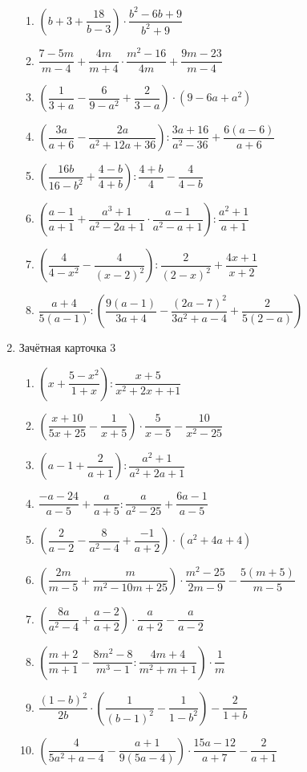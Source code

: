 \documentclass[12pt, a4paper]{article}
\begin{document}
\begin{enumerate}
\begin{enumerate}[label=\asbuk*)]
		\item \( \left( b+3+\dfrac{18}{b-3} \right)\cdot\dfrac{b^2-6b+9}{b^2+9} \)
		\item \( \dfrac{7-5m}{m-4}+\dfrac{4m}{m+4} \cdot\dfrac{m^2-16}{4m}+\dfrac{9m-23}{m-4}\)
		\item \( \left( \dfrac{1}{3+a}-\dfrac{6}{9-a^2}+\dfrac{2}{3-a} \right)\cdot(9-6a+a^2) \)
		\item \( \left(  \dfrac{3a}{a+6}-\dfrac{2a}{a^2+12a+36}\right) :\dfrac{3a+16}{a^2-36}+\dfrac{6(a-6)}{a+6}\)
		\item \( \left( \dfrac{16b}{16-b^2}+\dfrac{4-b}{4+b} \right):\dfrac{4+b}{4}-\dfrac{4}{4-b} \)
		\item \( \left( \dfrac{a-1}{a+1}+\dfrac{a^3+1}{a^2-2a+1}\cdot\dfrac{a-1}{a^2-a+1} \right):\dfrac{a^2+1}{a+1} \)
		\item \( \left( \dfrac{4}{4-x^2}-\dfrac{4}{(x-2)^2} \right) :\dfrac{2}{(2-x)^2}+\dfrac{4x+1}{x+2}\)
		\item \( \dfrac{a+4}{5(a-1)}:\left( \dfrac{9(a-1)}{3a+4}-\dfrac{(2a-7)^2}{3a^2+a-4}+\dfrac{2}{5(2-a)} \right) \)
	\end{enumerate}
	\item Зачётная карточка 3
	\begin{enumerate}[label=\asbuk*)]
		\item \( \left( x+\dfrac{5-x^2}{1+x} \right):\dfrac{x+5}{x^2+2x++1} \)
		\item \( \left( \dfrac{x+10}{5x+25} -\dfrac{1}{x+5}\right) \cdot\dfrac{5}{x-5}-\dfrac{10}{x^2-25}\)
		\item \( \left( a-1+\dfrac{2}{a+1} \right):\dfrac{a^2+1}{a^2+2a+1} \)
		\item \( \dfrac{-a-24}{a-5}+\dfrac{a}{a+5}:\dfrac{a}{a^2-25}+\dfrac{6a-1}{a-5} \)
		\item \( \left( \dfrac{2}{a-2}-\dfrac{8}{a^2-4}+\dfrac{-1}{a+2} \right)\cdot(a^2+4a+4) \)
		\item \( \left( \dfrac{2m}{m-5}+\dfrac{m}{m^2-10m+25} \right) \cdot\dfrac{m^2-25}{2m-9}-\dfrac{5(m+5)}{m-5}\)
		\item \( \left( \dfrac{8a}{a^2-4}+\dfrac{a-2}{a+2} \right) \cdot\dfrac{a}{a+2}-\dfrac{a}{a-2}\)
		\item \( \left( \dfrac{m+2}{m+1}-\dfrac{8m^2-8}{m^3-1}:\dfrac{4m+4}{m^2+m+1} \right)\cdot\dfrac{1}{m} \)
		\item \( \dfrac{(1-b)^2}{2b}\cdot\left( \dfrac{1}{(b-1)^2}-\dfrac{1}{1-b^2} \right) -\dfrac{2}{1+b}\)
		\item \( \left( \dfrac{4}{5a^2+a-4}-\dfrac{a+1}{9(5a-4)} \right) \cdot\dfrac{15a-12}{a+7}-\dfrac{2}{a+1}\)

\end{enumerate}
\end{enumerate}
\end{document}
